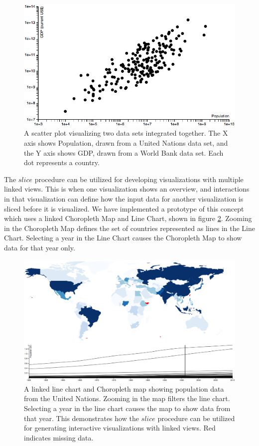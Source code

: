 \begin{figure}
  \centering
  \includegraphics[width=\figureWidth]{figs/scatter.png}
  \caption[Scatter Plot of Integrated Data]{A scatter plot visualizing two data sets integrated together. The X axis shows Population, drawn from a United Nations data set, and the Y axis shows GDP, drawn from a World Bank data set. Each dot represents a country.}
  \label{fig:scatter}
\end{figure}

The $slice$ procedure can be utilized for developing visualizations with multiple linked views. This is when one visualization shows an overview, and interactions in that visualization can define how the input data for another visualization is sliced before it is visualized. We have implemented a prototype of this concept which uses a linked Choropleth Map and Line Chart, shown in figure \ref{fig:choropleth}. Zooming in the Choropleth Map defines the set of countries represented as lines in the Line Chart. Selecting a year in the Line Chart causes the Choropleth Map to show data for that year only.

\begin{figure}
  \centering
  \includegraphics[width=\figureWidth]{figs/choropleth.png}
  \caption [Linked Line Chart and Choropleth Map]{A linked line chart and Choropleth map showing population data from the United Nations. Zooming in the map filters the line chart. Selecting a year in the line chart causes the map to show data from that year. This demonstrates how the $slice$ procedure can be utilized for generating interactive visualizations with linked views. Red indicates missing data.}
  \label{fig:choropleth}
\end{figure}

